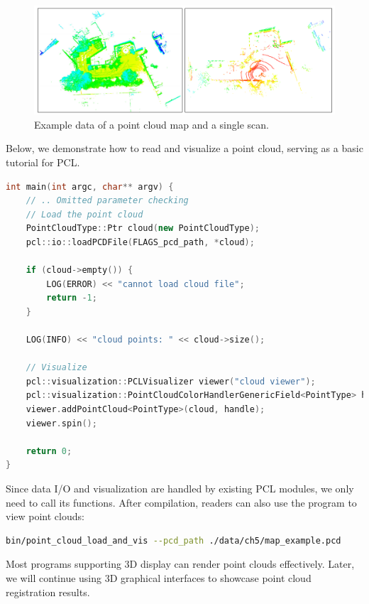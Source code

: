 \begin{figure}[!htp]  
	\centering  
	\includegraphics[width=1.0\textwidth]{resources/basic-point-cloud/pcd-example.pdf}  
	\caption{Example data of a point cloud map and a single scan.}  
	\label{fig:pcd-example}  
\end{figure}  

Below, we demonstrate how to read and visualize a point cloud, serving as a basic tutorial for PCL.  
\begin{lstlisting}[language=c++,caption=src/ch5/point\_cloud\_load\_and\_vis.cc]  
int main(int argc, char** argv) {  
	// .. Omitted parameter checking  
	// Load the point cloud  
	PointCloudType::Ptr cloud(new PointCloudType);  
	pcl::io::loadPCDFile(FLAGS_pcd_path, *cloud);  
	
	if (cloud->empty()) {  
		LOG(ERROR) << "cannot load cloud file";  
		return -1;  
	}  
	
	LOG(INFO) << "cloud points: " << cloud->size();  
	
	// Visualize  
	pcl::visualization::PCLVisualizer viewer("cloud viewer");  
	pcl::visualization::PointCloudColorHandlerGenericField<PointType> handle(cloud, "z");  // Color by height  
	viewer.addPointCloud<PointType>(cloud, handle);  
	viewer.spin();  
	
	return 0;  
}  
\end{lstlisting}  

Since data I/O and visualization are handled by existing PCL modules, we only need to call its functions. After compilation, readers can also use the program to view point clouds:  

\begin{lstlisting}[language=sh, caption=Terminal input:]  
bin/point_cloud_load_and_vis --pcd_path ./data/ch5/map_example.pcd  
\end{lstlisting}  

Most programs supporting 3D display can render point clouds effectively. Later, we will continue using 3D graphical interfaces to showcase point cloud registration results.

